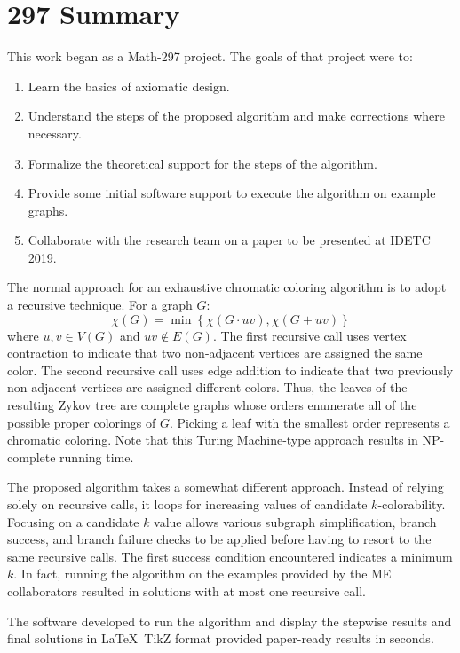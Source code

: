 \documentclass[letterpaper,12pt]{article}
\newcommand{\X}{\chi}
\begin{document}
\section*{297 Summary}

This work began as a Math-297 project.  The goals of that project were to:

\begin{enumerate}
\item Learn the basics of axiomatic design.
\item Understand the steps of the proposed algorithm and make corrections where necessary.
\item Formalize the theoretical support for the steps of the algorithm.
\item Provide some initial software support to execute the algorithm on example graphs.
\item Collaborate with the research team on a paper to be presented at IDETC 2019.
\end{enumerate}

The normal approach for an exhaustive chromatic coloring algorithm is to adopt a recursive technique.  For a graph
\(G\):
\[\X(G)=\min\left\{\X(G\cdot uv),\X(G+uv)\right\}\]
where \(u,v\in V(G)\) and \(uv\notin E(G)\).  The first recursive call uses vertex contraction to indicate that two
non-adjacent vertices are assigned the same color.  The second recursive call uses edge addition to indicate that
two previously non-adjacent vertices are assigned different colors.  Thus, the leaves of the resulting Zykov tree
are complete graphs whose orders enumerate all of the possible proper colorings of \(G\).  Picking a leaf with the
smallest order represents a chromatic coloring.  Note that this Turing Machine-type approach results in
NP-complete running time.

The proposed algorithm takes a somewhat different approach.  Instead of relying solely on recursive calls, it loops
for increasing values of candidate \(k\)-colorability.  Focusing on a candidate \(k\) value allows various subgraph
simplification, branch success, and branch failure checks to be applied before having to resort to the same
recursive calls.  The first success condition encountered indicates a minimum \(k\).  In fact, running the
algorithm on the examples provided by the ME collaborators resulted in solutions with at most one recursive call.

The software developed to run the algorithm and display the stepwise results and final solutions in \LaTeX\ TikZ
format provided paper-ready results in seconds.
\end{document}
